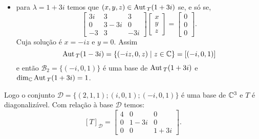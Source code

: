 \begin{exemplo}
\begin{enumerate}[label={\arabic*})]
\begin{solucao}
\begin{itemize}
                \item para $\lambda = 1 + 3i$ temos que $(x,y,z) \in {\rm Aut\,}_T(1 + 3i)$ se, e s\'o se,
                \[
                    \begin{bmatrix}
                        3i & 3 & 3\\
                        0 & 3 - 3i & 0\\
                        -3 & 3 & -3i
                    \end{bmatrix}\begin{bmatrix}
                        x\\y\\z
                    \end{bmatrix} = \begin{bmatrix}
                        0\\0\\0
                    \end{bmatrix}.
                \]
                Cuja solu\c{c}ão é $x = -iz$ e $y = 0$. Assim
                \[
                    {\rm Aut\,}_T(1 - 3i) = \{(-iz,0,z) \mid z \in \mathbb{C}\} = [(-i,0,1)]
                \]
                e ent\~ao $\mathcal{B}_2 = \{(-i,0,1)\}$ \'e uma base de ${\rm Aut\,}_T(1 + 3i)$ e $\dim_{\mathbb{C}}{\rm Aut\,}_T(1 + 3i) = 1$.
            \end{itemize}

            Logo o conjunto $\mathcal{D} = \{(2, 1, 1); (i, 0, 1); (-i, 0, 1)\}$ é uma base de $\mathbb{C}^3$ e $T$ é diagonalizável. Com rela\c{c}ão à base $\mathcal{D}$ temos:
            \[
                [T]_\mathcal{D} = \begin{bmatrix}4 & 0 & 0\\0 & 1 - 3i & 0\\0 & 0 & 1 + 3i\end{bmatrix}.
            \]
            \end{solucao}
    \end{enumerate}
\end{exemplo}

